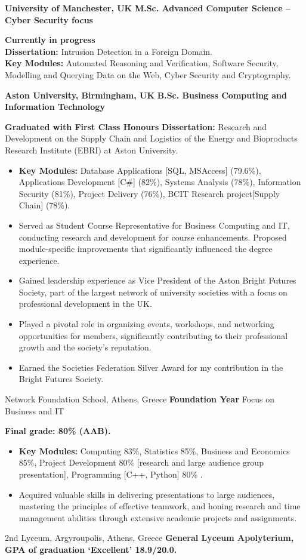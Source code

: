 {\textbf{University of Manchester, UK}}
{\textbf{M.Sc. Advanced Computer Science -- Cyber Security focus}}
{
    \textbf{Currently in progress}
    \\\textbf{Dissertation:} Intrusion Detection in a Foreign Domain.
    \\\textbf{Key Modules:} Automated Reasoning and Verification, Software Security, Modelling and Querying Data on the Web, Cyber Security and Cryptography.

}

{\textbf{Aston University, Birmingham, UK}}
{\textbf{B.Sc. Business Computing and Information Technology}}
{
    \textbf{Graduated with First Class Honours }
    \textbf{Dissertation:} Research and Development on the Supply Chain and Logistics of the Energy and Bioproducts Research Institute (EBRI) at Aston University.
    \begin{itemize}
        \item \textbf{Key Modules:} Database Applications [SQL, MSAccess] (79.6\%), Applications Development [C\#] (82\%), Systems Analysis (78\%), Information Security (81\%), Project Delivery (76\%), BCIT Research project[Supply Chain]  (78\%).
        \item Served as Student Course Representative for Business Computing and IT, conducting research and
              development for course enhancements. Proposed module-specific improvements that significantly
              influenced the degree experience.
        \item Gained leadership experience as Vice President of the Aston Bright Futures Society, part of the largest network of university societies with a focus on professional development in the UK.
        \item Played a pivotal role in organizing events, workshops, and networking opportunities for members, significantly contributing to their professional growth and the society's reputation.
        \item Earned the Societies Federation Silver Award for my contribution in the Bright Futures Society.
    \end{itemize}
}

{Network Foundation School, Athens, Greece}
{\textbf{Foundation Year} Focus on Business and IT}
{
    \textbf{Final grade: 80\% (AAB).}
    \begin{itemize}
        \item \textbf{Key Modules:} Computing 83\%, Statistics 85\%, Business and Economics 85\%, Project Development 80\% [research and large audience group presentation], Programming [C++, Python] 80\% .
        \item Acquired valuable skills in delivering presentations to large audiences, mastering the principles of effective teamwork, and honing research and time management abilities through extensive academic projects and assignments.
    \end{itemize}
}

{}
{2nd Lyceum, Argyroupolis, Athens, Greece}
{\textbf{General Lyceum Apolyterium, GPA of graduation ‘Excellent’ 18.9/20.0.}}
